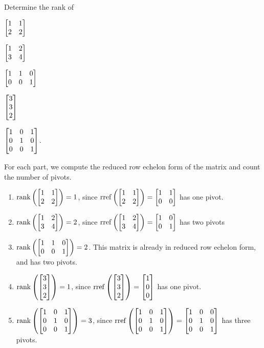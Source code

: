	\begin{parts}
		\item Determine the rank of
		\begin{enumerate*}
			\item $\mat{1&1\\2&2}$
			\item $\mat{1&2\\3&4}$
			\item $\mat{1&1&0\\0&0&1}$
			\item $\mat{3\\3\\2}$
			\item $\mat{1&0&1\\0&1&0\\0&0&1}$.
		\end{enumerate*}
		\begin{solution}
			For each part, we compute the reduced row echelon form of the matrix
			and count the number of pivots.
			\begin{enumerate}
				\item $\Rank\left(\mat{1&1\\2&2}\right)=1$, since
					$\rref\left(\mat{1&1\\2&2}\right)=\mat{1&1\\0&0}$ has one pivot.
				\item $\Rank\left(\mat{1&2\\3&4}\right)=2$, since
					$\rref\left(\mat{1&2\\3&4}\right)=\mat{1&0\\0&1}$ has two pivots
				\item $\Rank\left(\mat{1&1&0\\0&0&1}\right)=2$.
					This matrix is already in reduced row echelon form, and has two pivots.
				\item $\Rank\left(\mat{3\\3\\2}\right)=1$, since
					$\rref\left(\mat{3\\3\\2}\right)=\mat{1\\0\\0}$ has one pivot.
				\item $\Rank\left(\mat{1&0&1\\0&1&0\\0&0&1}\right)=3$, since
					$\rref\left(\mat{1&0&1\\0&1&0\\0&0&1}\right)=\mat{1&0&0\\0&1&0\\0&0&1}$
					has three pivots.
			\end{enumerate}
		\end{solution}
	\end{parts}


